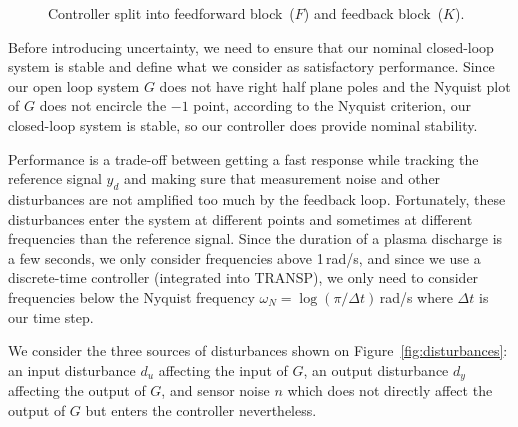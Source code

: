 \documentclass[12pt,lot, lof]{puthesis}
\begin{document}
\begin{figure}[htbp]
	\centering
	\caption{Controller split into feedforward block~($F$) and feedback block~($K$).}
	\label{fig:split_controller}
\end{figure}

Before introducing uncertainty, we need to ensure that our nominal closed-loop system is stable and define what we consider as satisfactory performance.
Since our open loop system $G$ does not have right half plane poles and the Nyquist plot of $G$ does not encircle the $-1$ point, according to the Nyquist criterion, our closed-loop system is stable, so our controller does provide nominal stability.

Performance is a trade-off between getting a fast response while tracking the reference signal $y_d$ and making sure that measurement noise and other disturbances are not amplified too much by the feedback loop.
Fortunately, these disturbances enter the system at different points and sometimes at different frequencies than the reference signal.
Since the duration of a plasma discharge is a few seconds, we only consider frequencies above 1\,rad/s,
and since we use a discrete-time controller (integrated into TRANSP), we only need to consider frequencies below the Nyquist frequency $\omega_N = \log(\pi/\Delta t)$\,rad/s where $\Delta t$ is our time step.

We consider the three sources of disturbances shown on Figure~\ref{fig:disturbances}: an input disturbance $d_u$ affecting the input of $G$, an output disturbance $d_y$ affecting the output of $G$, and sensor noise $n$ which does not directly affect the output of $G$ but enters the controller nevertheless.
\end{document}
